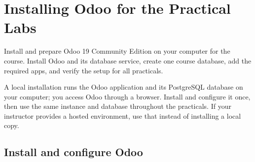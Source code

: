 \chapter{Installing Odoo for the Practical Labs}
\label{ch:toolkit}

\chapterguide%
  {Install and prepare Odoo 19 Community Edition on your computer for the course.}%
  {Install Odoo and its database service, create one course database, add the required apps, and verify the setup for all practicals.}

A local installation runs the Odoo application and its PostgreSQL database on
your computer; you access Odoo through a browser. Install and configure it
once, then use the same instance and database throughout the practicals. If
your instructor provides a hosted environment, use that instead of installing
a local copy.

\section{Install and configure Odoo}

